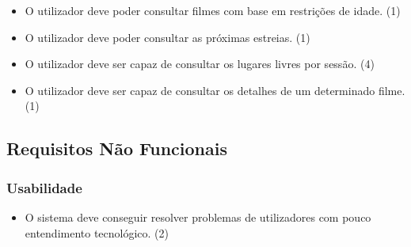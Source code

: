 \documentclass[11pt,a4paper]{article}
\newcommand{\requirement}[3]{
    #1 (#3)
}
\begin{document}
\begin{appendices}
\begin{itemize}
    \item \requirement{O utilizador deve poder consultar filmes com base em restrições de idade.}{A consulta de filmes
    com base em restrições de idade permite aos utilizadores adaptar as suas escolhas às suas preferências.}{1}
    \item \requirement{O utilizador deve poder consultar as próximas estreias.}
    {A consulta das próximas estreias permite ao utilizador escolher os filmes mais recentes.}{1}
    \item \requirement{O utilizador deve ser capaz de consultar os lugares livres por sessão.}{A consulta
    dos lugares livres é vital para que um utilizador possa determinar se é possível frequentar uma determinada
    sessão.}{4}
    \item \requirement{O utilizador deve ser capaz de consultar os detalhes de um determinado filme.}{A consulta
    da informação relativa a um filme permite ao utilizador decidir se o mesmo é do seu interesse.}{1}
\end{itemize}


\subsection{Requisitos Não Funcionais}

\subsubsection{Usabilidade}

\begin{itemize}
    \setlength\itemsep{0em}
    \item \requirement
    {O sistema deve conseguir resolver problemas de utilizadores com pouco entendimento tecnológico.}
    {Por exemplo, certos utilizadores podem não saber desligar um \textit{router}, por isso o sistema 
    precisará de encontrar outras soluções para um problema.}
    {2}
\end{itemize}


\end{appendices}
\end{document}
